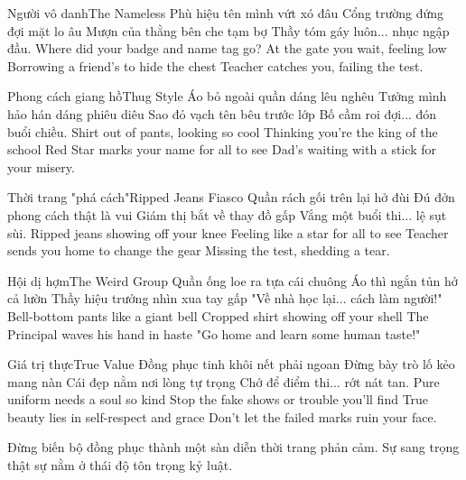 \begin{tutuyetbox}{Người vô danh}{The Nameless}
Phù hiệu tên mình vứt xó đâu
Cổng trường đứng đợi mặt lo âu
Mượn của thằng bên che tạm bợ
Thầy tóm gáy luôn... nhục ngập đầu.
\tcblower
Where did your badge and name tag go?
At the gate you wait, feeling low
Borrowing a friend's to hide the chest
Teacher catches you, failing the test.
\end{tutuyetbox}

\begin{tutuyetbox}{Phong cách giang hồ}{Thug Style}
Áo bỏ ngoài quần dáng lêu nghêu
Tưởng mình hảo hán dáng phiêu diêu
Sao đỏ vạch tên bêu trước lớp
Bố cầm roi đợi... đón buổi chiều.
\tcblower
Shirt out of pants, looking so cool
Thinking you're the king of the school
Red Star marks your name for all to see
Dad's waiting with a stick for your misery.
\end{tutuyetbox}

\begin{tutuyetbox}{Thời trang "phá cách"}{Ripped Jeans Fiasco}
Quần rách gối trên lại hở đùi
Đú đởn phong cách thật là vui
Giám thị bắt về thay đồ gấp
Vắng một buổi thi... lệ sụt sùi.
\tcblower
Ripped jeans showing off your knee
Feeling like a star for all to see
Teacher sends you home to change the gear
Missing the test, shedding a tear.
\end{tutuyetbox}

\begin{tutuyetbox}{Hội dị hợm}{The Weird Group}
Quần ống loe ra tựa cái chuông
Áo thì ngắn tủn hở cả lườn
Thầy hiệu trưởng nhìn xua tay gấp
"Về nhà học lại... cách làm người!"
\tcblower
Bell-bottom pants like a giant bell
Cropped shirt showing off your shell
The Principal waves his hand in haste
"Go home and learn some human taste!"
\end{tutuyetbox}

\begin{tutuyetbox}{Giá trị thực}{True Value}
Đồng phục tinh khôi nết phải ngoan
Đừng bày trò lố kẻo mang nàn
Cái đẹp nằm nơi lòng tự trọng
Chớ để điểm thi... rớt nát tan.
\tcblower
Pure uniform needs a soul so kind
Stop the fake shows or trouble you'll find
True beauty lies in self-respect and grace
Don't let the failed marks ruin your face.
\end{tutuyetbox}

\begin{ghichu}
Đừng biến bộ đồng phục thành một sàn diễn thời trang phản cảm. Sự sang trọng thật sự nằm ở thái độ tôn trọng kỷ luật.
\end{ghichu}
